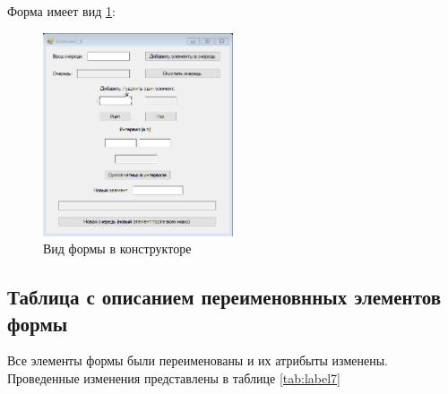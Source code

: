 Форма имеет вид \ref{fig:FormInConstruct7}:

\newpage

\begin{figure}[!h]
    \centering
    \includegraphics[width = 0.5\textwidth]{images/Task7/FormInConstructor.png}
    \caption{Вид формы в конструкторе}
    \label{fig:FormInConstruct7}
\end{figure}

\subsection{Таблица с описанием переименовнных элементов формы}

Все элементы формы были переименованы и их атрибыты изменены. Проведенные изменения представлены в таблице \ref{tab:label7}

